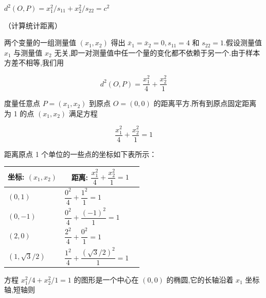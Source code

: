 $d^2(O,P) = x_1^2/s_{11} + x_2^2/s_{22} = c^2$

\quad （计算统计距离）

两个变量的一组测量值 $(x_1,x_2)$ 得出 $\bar{x}_1 = \bar{x}_2 = 0, s_{11} = 4$ 和 $s_{22} = 1$.假设测量值 $x_1$ 与测量值 $x_2$ 无关,即一对测量值中任一个量的变化都不依赖于另一个.由于样本方差不相等,我们用

\[
d^2(O,P) = \frac{x_1^2}{4} + \frac{x_2^2}{1}
\]

度量任意点 $P = (x_1,x_2)$ 到原点 $O = (0,0)$ 的距离平方.所有到原点固定距离为 1 的点 $(x_1,x_2)$ 满足方程

\[
\frac{x_1^2}{4} + \frac{x_2^2}{1} = 1
\]

距离原点 1 个单位的一些点的坐标如下表所示：

\begin{mvtable}
\begin{tabular}{ll|l|l}
\multicolumn{2}{c|}{坐标: $(x_1,x_2)$} & \multicolumn{2}{c}{距离: $\dfrac{x_1^2}{4} + \dfrac{x_2^2}{1} = 1$} \\
\hline
$(0,1)$ & & $\dfrac{0^2}{4} + \dfrac{1^2}{1} = 1$ & \\
$(0,-1)$ & & $\dfrac{0^2}{4} + \dfrac{(-1)^2}{1} = 1$ & \\
$(2,0)$ & & $\dfrac{2^2}{4} + \dfrac{0^2}{1} = 1$ & \\
$(1,\sqrt{3}/2)$ & & $\dfrac{1^2}{4} + \dfrac{(\sqrt{3}/2)^2}{1} = 1$ & \\
\end{tabular}
\end{mvtable}

方程 $x_1^2/4 + x_2^2/1 = 1$ 的图形是一个中心在 $(0,0)$ 的椭圆,它的长轴沿着 $x_1$ 坐标轴,短轴则
